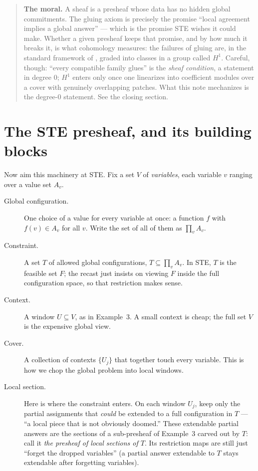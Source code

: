 \documentclass[11pt]{article}
\begin{document}
\begin{quote}
\textbf{The moral.}  A sheaf is a presheaf whose data has no hidden
global commitments.  The gluing axiom is precisely the promise
``local agreement implies a global answer'' --- which is the promise
STE wishes it could make.  Whether a given presheaf keeps that promise,
and by how much it breaks it, is what cohomology measures: the failures
of gluing are, in the standard framework of
\citet{abramsky2012cohomology}, graded into classes in a group called
$H^1$.  Careful, though: ``every compatible family glues'' is the
\emph{sheaf condition}, a statement in degree $0$; $H^1$ enters only
once one linearizes into coefficient modules over a cover with genuinely
overlapping patches.  What this note mechanizes is the degree-$0$
statement.  See the closing section.
\end{quote}

\section{The STE presheaf, and its building blocks}
Now aim this machinery at STE.  Fix a set $V$ of \emph{variables},
each variable $v$ ranging over a value set $A_v$.

\begin{description}
\item[Global configuration.] One choice of a value for every variable
  at once: a function $f$ with $f(v)\in A_v$ for all $v$.  Write the set
  of all of them as $\prod_v A_v$.
\item[Constraint.] A set $T$ of allowed global configurations,
  $T\subseteq\prod_v A_v$.  In STE, $T$ is the feasible set $F$; the
  recast just insists on viewing $F$ inside the full configuration
  space, so that restriction makes sense.
\item[Context.] A window $U\subseteq V$, as in Example~3.  A small
  context is cheap; the full set $V$ is the expensive global view.
\item[Cover.] A collection of contexts $\{U_j\}$ that together touch
  every variable.  This is how we chop the global problem into local
  windows.
\item[Local section.] Here is where the constraint enters.  On each
  window $U_j$, keep only the partial assignments that \emph{could} be
  extended to a full configuration in $T$ --- ``a local piece that is
  not obviously doomed.''  These extendable partial answers are the
  sections of a sub-presheaf of Example~3 carved out by $T$: call it
  \emph{the presheaf of local sections of $T$}.  Its restriction maps
  are still just ``forget the dropped variables'' (a partial answer
  extendable to $T$ stays extendable after forgetting variables).
\end{description}
\end{document}

